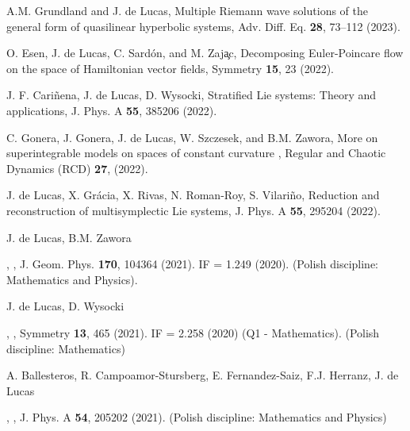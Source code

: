 \documentclass[12pt,reqno]{amsbook}
\begin{document}
\begin{enumerate}
\item A.M. Grundland and J. de Lucas, \color{blue} Multiple Riemann wave solutions of the general form
of quasilinear hyperbolic systems\color{black}, Adv. Diff. Eq. {\bf 28}, 73--112 (2023).

\item O. Esen, J. de Lucas, C. Sard\'on, and M. Zaj\c ac, \color{blue}  Decomposing Euler-Poincare flow on the space of Hamiltonian vector fields\color{black}, Symmetry {\bf 15}, 23 (2022).


\item J. F. Cari\~nena, J. de Lucas, D. Wysocki, \color{blue} Stratified Lie systems: Theory and applications,  \color{black} J. Phys. A {\bf 55}, 385206 (2022).

\item C. Gonera, J. Gonera, J. de Lucas,  W. Szczesek, and B.M. Zawora, \color{blue} More on superintegrable models on spaces of constant curvature \color{black}, Regular and Chaotic Dynamics (RCD) {\bf 27}, (2022).


\item J. de Lucas,
X.  Gr\'acia, X. Rivas, N. Roman-Roy, S. Vilariño, \color{blue}Reduction and reconstruction of multisymplectic Lie systems\color{black},  J. Phys. A {\bf 55}, 295204 (2022).

                {\item J. de Lucas, B.M. Zawora}, \color{blue}{A time-dependent energy-momentum method}\color{black}, J. Geom. Phys. {\bf 170}, 104364 (2021). IF = 1.249 (2020). (Polish discipline: Mathematics and Physics).
        
        {\item J. de Lucas, D. Wysocki}, \color{blue}{Darboux families and the classification of real four-dimensional indecomposable coboundary Lie bialgebras}\color{black}, Symmetry  {\bf 13}, 465 (2021). IF = 2.258 (2020) (Q1 - Mathematics). (Polish discipline: Mathematics) 
        
        {\item A. Ballesteros, R. Campoamor-Stursberg, E. Fernandez-Saiz, F.J. Herranz, J. de Lucas}, \color{blue}{Poisson-Hopf deformations of Lie-Hamilton systems revisited: deformed superposition rules and applications to the oscillator algebra}\color{black}, J. Phys. A {\bf 54}, 205202 (2021).  (Polish discipline: Mathematics and Physics)


\end{enumerate}
\end{document}
